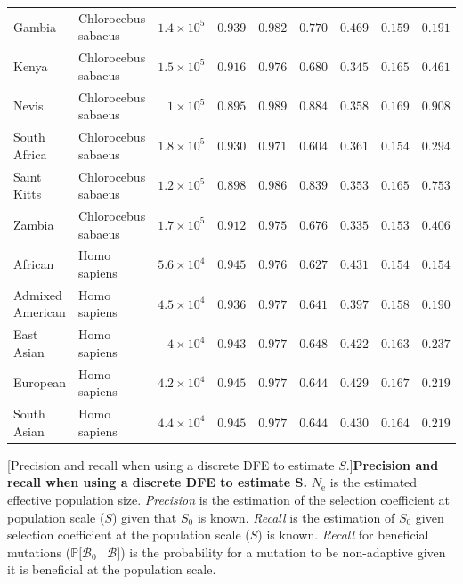 \documentclass{article}
\newcommand{\Ne}{N_{\text{e}}}
\newcommand{\proba}{\mathbb{P}}
\newcommand{\Sphy}{S_{0}}
\newcommand{\SphyBen}{\mathcal{B}_0}
\newcommand{\given}{\mid}
\newcommand{\Spop}{S}
\newcommand{\SpopBen}{\mathcal{B}}
\begin{document}
\begin{center}
\begin{adjustbox}{width=\textwidth}
\begin{tabular}{||l|l|r||r|r||r|r||r|r||}
                \rowcolor{LIGHTGREY} Gambia & Chlorocebus sabaeus & $1.4\times 10^{5}$ & $ 0.939$ & $ 0.982$ & $ 0.770$ & $ 0.469$ & $ 0.159$ & $ 0.191$ \\
                \rowcolor{LIGHTGREY} Kenya & Chlorocebus sabaeus & $1.5\times 10^{5}$ & $ 0.916$ & $ 0.976$ & $ 0.680$ & $ 0.345$ & $ 0.165$ & $ 0.461$ \\
                \rowcolor{LIGHTGREY} Nevis & Chlorocebus sabaeus & $ 1\times 10^{5}$ & $ 0.895$ & $ 0.989$ & $ 0.884$ & $ 0.358$ & $ 0.169$ & $ 0.908$ \\
                \rowcolor{LIGHTGREY} South Africa & Chlorocebus sabaeus & $1.8\times 10^{5}$ & $ 0.930$ & $ 0.971$ & $ 0.604$ & $ 0.361$ & $ 0.154$ & $ 0.294$ \\
                \rowcolor{LIGHTGREY} Saint Kitts & Chlorocebus sabaeus & $1.2\times 10^{5}$ & $ 0.898$ & $ 0.986$ & $ 0.839$ & $ 0.353$ & $ 0.165$ & $ 0.753$ \\
                \rowcolor{LIGHTGREY} Zambia & Chlorocebus sabaeus & $1.7\times 10^{5}$ & $ 0.912$ & $ 0.975$ & $ 0.676$ & $ 0.335$ & $ 0.153$ & $ 0.406$ \\
                African & Homo sapiens & $5.6\times 10^{4}$ & $ 0.945$ & $ 0.976$ & $ 0.627$ & $ 0.431$ & $ 0.154$ & $ 0.154$ \\
                Admixed American & Homo sapiens & $4.5\times 10^{4}$ & $ 0.936$ & $ 0.977$ & $ 0.641$ & $ 0.397$ & $ 0.158$ & $ 0.190$ \\
                East Asian & Homo sapiens & $ 4\times 10^{4}$ & $ 0.943$ & $ 0.977$ & $ 0.648$ & $ 0.422$ & $ 0.163$ & $ 0.237$ \\
                European & Homo sapiens & $4.2\times 10^{4}$ & $ 0.945$ & $ 0.977$ & $ 0.644$ & $ 0.429$ & $ 0.167$ & $ 0.219$ \\
                South Asian & Homo sapiens & $4.4\times 10^{4}$ & $ 0.945$ & $ 0.977$ & $ 0.644$ & $ 0.430$ & $ 0.164$ & $ 0.219$ \\
                \bottomrule
            \end{tabular}
        \end{adjustbox}
        [Precision and recall when using a discrete DFE to estimate $\Spop$.]{\textbf{Precision and recall when using a discrete DFE to estimate $\bm{\Spop}$.}
        $\Ne$ is the estimated effective population size.
        \textit{Precision} is the estimation of the selection coefficient at population scale ($\Spop$) given that $\Sphy$ is known.
        \textit{Recall} is the estimation of $\Sphy$ given selection coefficient at the population scale ($\Spop$) is known.
        \textit{Recall} for beneficial mutations ($\proba{[}\SphyBen \given \SpopBen{]}$) is the probability for a mutation to be non-adaptive given it is beneficial at the population scale.\label{table:discrete-dfe}}
    \end{center}

    \printbibliography
\end{document}
